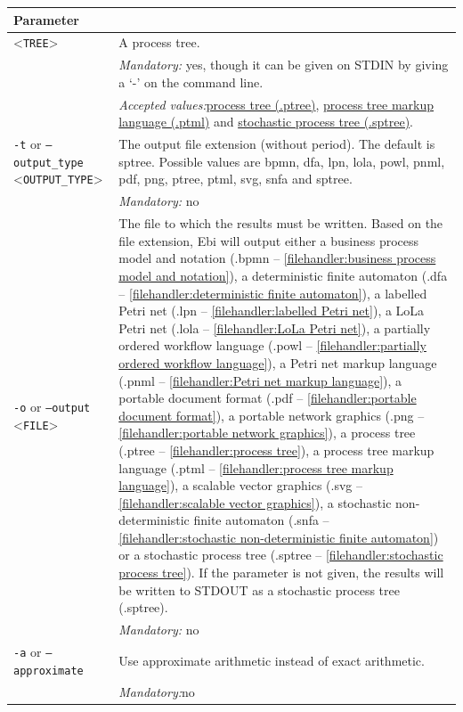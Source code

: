 {\begin{tabularx}{\linewidth}{lX}
\toprule
Parameter \\\midrule
<\texttt{TREE}>&A process tree.\\
&\textit{Mandatory:} \quad yes, though it can be given on STDIN by giving a `-' on the command line.\\
&\textit{Accepted values:}\quad \hyperref[filehandler:process tree]{process tree (.ptree)}, \hyperref[filehandler:process tree markup language]{process tree markup language (.ptml)} and \hyperref[filehandler:stochastic process tree]{stochastic process tree (.sptree)}.\\
\texttt{-t} or \texttt{--output\_type} <\texttt{OUTPUT\_TYPE}> &
The output file extension (without period). The default is sptree. Possible values are bpmn, dfa, lpn, lola, powl, pnml, pdf, png, ptree, ptml, svg, snfa and sptree.\\
&\textit{Mandatory:} \quad no\\
\texttt{-o} or \texttt{--output} <\texttt{FILE}> &
The file to which the results must be written. Based on the file extension, Ebi will output either a business process model and notation (.bpmn -- \cref{filehandler:business process model and notation}), a deterministic finite automaton (.dfa -- \cref{filehandler:deterministic finite automaton}), a labelled Petri net (.lpn -- \cref{filehandler:labelled Petri net}), a LoLa Petri net (.lola -- \cref{filehandler:LoLa Petri net}), a partially ordered workflow language (.powl -- \cref{filehandler:partially ordered workflow language}), a Petri net markup language (.pnml -- \cref{filehandler:Petri net markup language}), a portable document format (.pdf -- \cref{filehandler:portable document format}), a portable network graphics (.png -- \cref{filehandler:portable network graphics}), a process tree (.ptree -- \cref{filehandler:process tree}), a process tree markup language (.ptml -- \cref{filehandler:process tree markup language}), a scalable vector graphics (.svg -- \cref{filehandler:scalable vector graphics}), a stochastic non-deterministic finite automaton (.snfa -- \cref{filehandler:stochastic non-deterministic finite automaton}) or a stochastic process tree (.sptree -- \cref{filehandler:stochastic process tree}).
If the parameter is not given, the results will be written to STDOUT as a stochastic process tree (.sptree).\\
&\textit{Mandatory:} \quad no\\
\texttt{-a} or \texttt{--approximate} & Use approximate arithmetic instead of exact arithmetic.\\
&\textit{Mandatory:}\quad no\\

\end{tabularx}}

